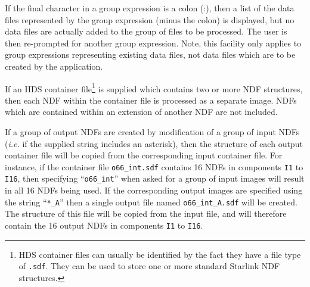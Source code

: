 \documentclass[twoside,11pt]{article}
\renewcommand{\_}{\texttt{\symbol{95}}}
\begin{document}
If the final character in a group expression is a colon (:), then a list
of the data files represented by the group expression (minus the colon)
is displayed, but no data files are actually added to the group of files
to be processed. The user is then re-prompted for another group
expression. Note, this facility only applies to group expressions
representing existing data files, not data files which are to be created
by the application.

If an HDS container file\footnote{HDS container files can usually be 
identified by the fact they have a file type of {\tt .sdf}. They can be 
used to store one or more standard Starlink NDF structures.} is supplied
which contains two or more NDF structures, then each NDF within the
container file is processed as a separate image. NDFs which are contained
within an extension of another NDF are not included.

If a group of output NDFs are created by modification of a group of
input NDFs (\emph{i.e.} if the supplied string includes an asterisk), then 
the structure of each output container file will be
copied from the corresponding input container file. For instance, if
the container file \verb+o66_int.sdf+ contains 16 NDFs in components
\verb+I1+ to \verb+I16+, then specifying ``\verb+o66_int+'' when asked
for a group of input images will result in all 16 NDFs being used.
If the corresponding output images are specified using the string
``\verb+*_A+'' then a single output file named \verb+o66_int_A.sdf+ will be created.
The structure of this file will be copied from the input file, and will
therefore contain the 16 output NDFs in components \verb+I1+ to \verb+I16+.
\end{document}
